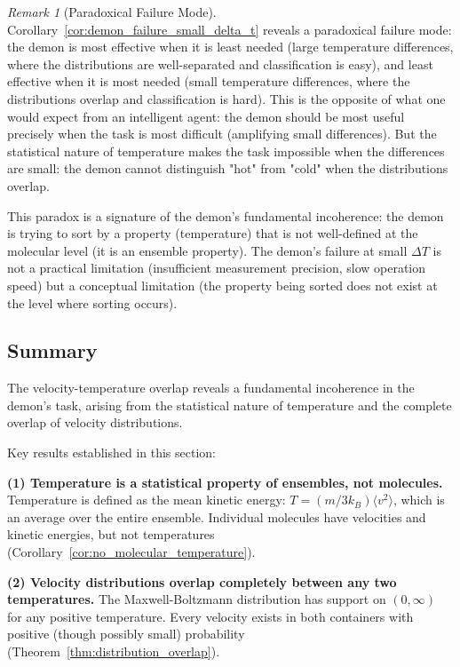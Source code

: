\documentclass[12pt,a4paper]{article}
\theoremstyle{definition}
\theoremstyle{remark}
\newtheorem{remark}[theorem]{Remark}
\begin{document}
\begin{remark}[Paradoxical Failure Mode]
\label{rem:paradoxical_failure}
Corollary~\ref{cor:demon_failure_small_delta_t} reveals a paradoxical failure mode: the demon is most effective when it is least needed (large temperature differences, where the distributions are well-separated and classification is easy), and least effective when it is most needed (small temperature differences, where the distributions overlap and classification is hard). This is the opposite of what one would expect from an intelligent agent: the demon should be most useful precisely when the task is most difficult (amplifying small differences). But the statistical nature of temperature makes the task impossible when the differences are small: the demon cannot distinguish "hot" from "cold" when the distributions overlap.

This paradox is a signature of the demon's fundamental incoherence: the demon is trying to sort by a property (temperature) that is not well-defined at the molecular level (it is an ensemble property). The demon's failure at small $\Delta T$ is not a practical limitation (insufficient measurement precision, slow operation speed) but a conceptual limitation (the property being sorted does not exist at the level where sorting occurs).
\end{remark}

\subsection{Summary}

The velocity-temperature overlap reveals a fundamental incoherence in the demon's task, arising from the statistical nature of temperature and the complete overlap of velocity distributions.

Key results established in this section:

\textbf{(1) Temperature is a statistical property of ensembles, not molecules.} Temperature is defined as the mean kinetic energy: $T = (m / 3k_B) \langle v^2 \rangle$, which is an average over the entire ensemble. Individual molecules have velocities and kinetic energies, but not temperatures (Corollary~\ref{cor:no_molecular_temperature}).

\textbf{(2) Velocity distributions overlap completely between any two temperatures.} The Maxwell-Boltzmann distribution has support on $(0, \infty)$ for any positive temperature. Every velocity exists in both containers with positive (though possibly small) probability (Theorem~\ref{thm:distribution_overlap}).
\end{document}
